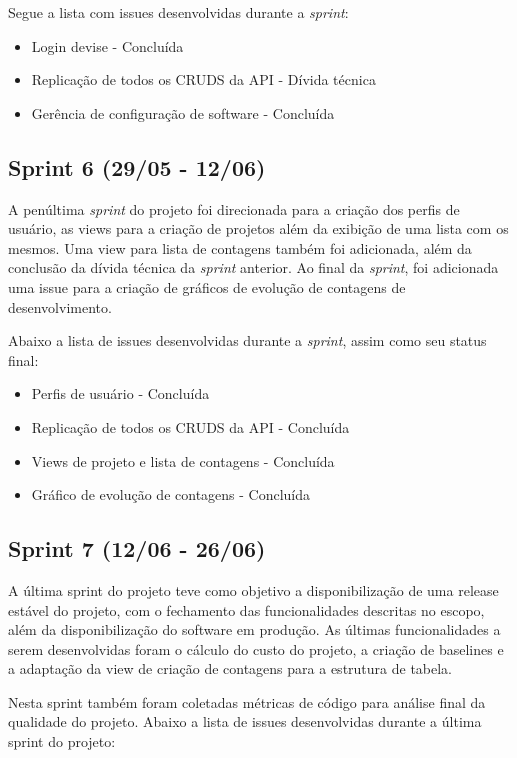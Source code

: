 Segue a lista com issues desenvolvidas durante a \textit{sprint}:

\begin{itemize}
  \item Login devise - Concluída
  \item Replicação de todos os CRUDS da API - Dívida técnica
  \item Gerência de configuração de software - Concluída
\end{itemize}

\subsection{Sprint 6 (29/05 - 12/06)}

A penúltima \textit{sprint} do projeto foi direcionada para a criação dos perfis de usuário, as views para a criação de projetos além da exibição de uma lista com os mesmos. Uma view para  lista de contagens também foi adicionada, além da conclusão da dívida técnica da \textit{sprint} anterior. Ao final da \textit{sprint}, foi adicionada uma issue para a criação de gráficos de evolução de contagens de desenvolvimento.

Abaixo a lista de issues desenvolvidas durante a \textit{sprint}, assim como seu status final:

\begin{itemize}
  \item Perfis de usuário - Concluída
  \item Replicação de todos os CRUDS da API - Concluída
  \item Views de projeto e lista de contagens - Concluída
  \item Gráfico de evolução de contagens - Concluída
\end{itemize}

\subsection{Sprint 7 (12/06 - 26/06)}

A última sprint do projeto teve como objetivo a disponibilização de uma release estável do projeto, com o fechamento das funcionalidades descritas no escopo, além da disponibilização do software em produção. As últimas funcionalidades a serem desenvolvidas foram o cálculo do custo do projeto, a criação de baselines e a adaptação da view de criação de contagens para a estrutura de tabela.

Nesta sprint  também foram coletadas métricas de código para análise final da qualidade do projeto. Abaixo a lista de issues desenvolvidas durante a última sprint do projeto:

